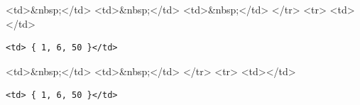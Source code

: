 \textless{}td\textgreater{}\&nbsp;\textless{}/td\textgreater{} \textless{}td\textgreater{}\&nbsp;\textless{}/td\textgreater{} \textless{}td\textgreater{}\&nbsp;\textless{}/td\textgreater{} \textless{}/tr\textgreater{} \textless{}tr\textgreater{} \textless{}td\textgreater{}\textless{}/td\textgreater{}

\begin{verbatim}
<td> { 1, 6, 50 }</td>
\end{verbatim}

\textless{}td\textgreater{}\&nbsp;\textless{}/td\textgreater{} \textless{}td\textgreater{}\&nbsp;\textless{}/td\textgreater{} \textless{}/tr\textgreater{} \textless{}tr\textgreater{} \textless{}td\textgreater{}\textless{}/td\textgreater{}

\begin{verbatim}
<td> { 1, 6, 50 }</td>
\end{verbatim}

